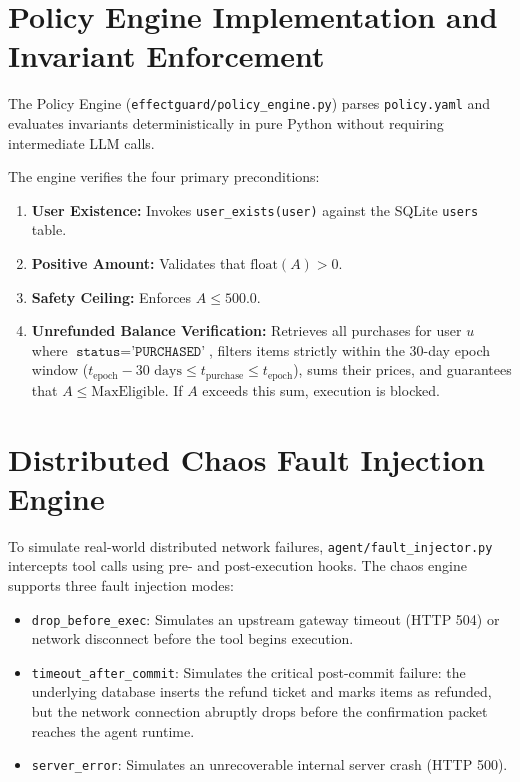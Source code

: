 \section{Policy Engine Implementation and Invariant Enforcement}
\label{sec:impl_policy}
The Policy Engine (\texttt{effectguard/policy\_engine.py}) parses \texttt{policy.yaml} and evaluates invariants deterministically in pure Python without requiring intermediate LLM calls.

The engine verifies the four primary preconditions:
\begin{enumerate}
    \item \textbf{User Existence:} Invokes \texttt{user\_exists(user)} against the SQLite \texttt{users} table.
    \item \textbf{Positive Amount:} Validates that $\text{float}(A) > 0$.
    \item \textbf{Safety Ceiling:} Enforces $A \le 500.0$.
    \item \textbf{Unrefunded Balance Verification:} Retrieves all purchases for user $u$ where $\texttt{status} = \texttt{'PURCHASED'}$, filters items strictly within the 30-day epoch window ($t_{\text{epoch}} - 30\text{ days} \le t_{\text{purchase}} \le t_{\text{epoch}}$), sums their prices, and guarantees that $A \le \text{MaxEligible}$. If $A$ exceeds this sum, execution is blocked.
\end{enumerate}

\section{Distributed Chaos Fault Injection Engine}
\label{sec:impl_chaos}
To simulate real-world distributed network failures, \texttt{agent/fault\_injector.py} intercepts tool calls using pre- and post-execution hooks. The chaos engine supports three fault injection modes:
\begin{itemize}
    \item \texttt{drop\_before\_exec}: Simulates an upstream gateway timeout (HTTP 504) or network disconnect before the tool begins execution.
    \item \texttt{timeout\_after\_commit}: Simulates the critical post-commit failure: the underlying database inserts the refund ticket and marks items as refunded, but the network connection abruptly drops before the confirmation packet reaches the agent runtime.
    \item \texttt{server\_error}: Simulates an unrecoverable internal server crash (HTTP 500).
\end{itemize}

